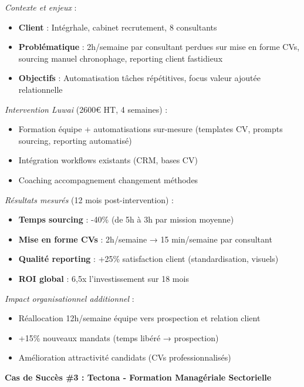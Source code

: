 \emph{Contexte et enjeux} \cite{luwai2025integrhale} :
\begin{itemize}
    \item \textbf{Client} : Intégrhale, cabinet recrutement, 8 consultants
    \item \textbf{Problématique} : 2h/semaine par consultant perdues sur mise en forme CVs, sourcing manuel chronophage, reporting client fastidieux
    \item \textbf{Objectifs} : Automatisation tâches répétitives, focus valeur ajoutée relationnelle
\end{itemize}
\medskip
\emph{Intervention Luwai} (2600€ HT, 4 semaines) :
\begin{itemize}
    \item Formation équipe + automatisations sur-mesure (templates CV, prompts sourcing, reporting automatisé)
    \item Intégration workflows existants (CRM, bases CV)
    \item Coaching accompagnement changement méthodes
\end{itemize}

\emph{Résultats mesurés} (12 mois post-intervention) :
\begin{itemize}
    \item \textbf{Temps sourcing} : -40\% (de 5h à 3h par mission moyenne)
    \item \textbf{Mise en forme CVs} : 2h/semaine → 15 min/semaine par consultant
    \item \textbf{Qualité reporting} : +25\% satisfaction client (standardisation, visuels)
    \item \textbf{ROI global} : 6,5x l'investissement sur 18 mois
\end{itemize}
\medskip
\emph{Impact organisationnel additionnel} :
\begin{itemize}
    \item Réallocation 12h/semaine équipe vers prospection et relation client
    \item +15\% nouveaux mandats (temps libéré → prospection)
    \item Amélioration attractivité candidats (CVs professionnalisés)
\end{itemize}
\medskip
\textbf{Cas de Succès \#3 : Tectona - Formation Managériale Sectorielle}

